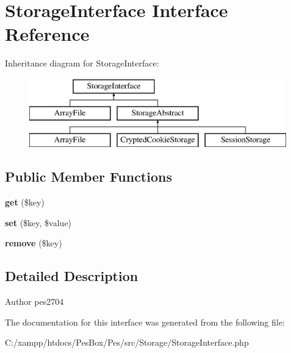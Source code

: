 \hypertarget{interface_pes_1_1_storage_1_1_storage_interface}{}\section{Storage\+Interface Interface Reference}
\label{interface_pes_1_1_storage_1_1_storage_interface}
Inheritance diagram for Storage\+Interface\+:\begin{figure}[H]
\begin{center}
\leavevmode
\includegraphics[height=3.000000cm]{interface_pes_1_1_storage_1_1_storage_interface}
\end{center}
\end{figure}
\subsection*{Public Member Functions}
\begin{DoxyCompactItemize}
\item 
\mbox{\label{interface_pes_1_1_storage_1_1_storage_interface_a24a9bf83a1002d46ece83a93d14bd921}} 
{\bfseries get} (\$key)
\item 
\mbox{\label{interface_pes_1_1_storage_1_1_storage_interface_aab787bd83f84f4215dceb35f7c305eee}} 
{\bfseries set} (\$key, \$value)
\item 
\mbox{\label{interface_pes_1_1_storage_1_1_storage_interface_a95483af4e2c07dc9893fe058b026bd5d}} 
{\bfseries remove} (\$key)
\end{DoxyCompactItemize}


\subsection{Detailed Description}
\begin{DoxyAuthor}{Author}
pes2704 
\end{DoxyAuthor}


The documentation for this interface was generated from the following file\+:\begin{DoxyCompactItemize}
\item 
C\+:/xampp/htdocs/\+Pes\+Box/\+Pes/src/\+Storage/Storage\+Interface.\+php\end{DoxyCompactItemize}
